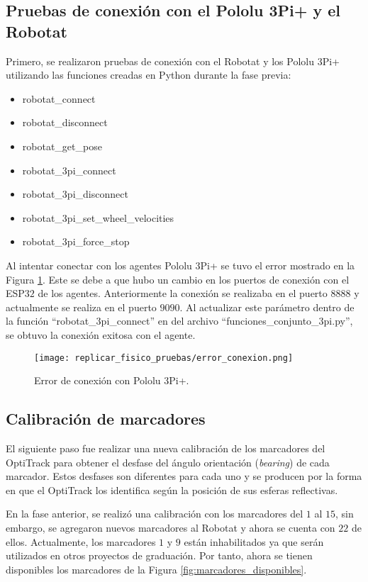 \subsection{Pruebas de conexión con el Pololu 3Pi+ y el Robotat}
 Primero, se realizaron pruebas de conexión con el Robotat y los Pololu 3Pi+ utilizando las funciones creadas en Python durante la fase previa:
 
\begin{itemize}
	\item robotat\_connect
	\item robotat\_disconnect
	\item robotat\_get\_pose
	\item robotat\_3pi\_connect
	\item robotat\_3pi\_disconnect
	\item robotat\_3pi\_set\_wheel\_velocities
	\item robotat\_3pi\_force\_stop
\end{itemize}

Al intentar conectar con los agentes Pololu 3Pi+ se tuvo el error mostrado en la Figura \ref{fig:error_conexion}. Este se debe a que hubo un cambio en los puertos de conexión con el ESP$32$ de los agentes. Anteriormente la conexión se realizaba en el puerto $8888$ y actualmente se realiza en el puerto $9090$. Al actualizar este parámetro dentro de la función ``robotat\_3pi\_connect'' en del archivo ``funciones\_conjunto\_3pi.py'', se obtuvo la conexión exitosa con el agente.

\begin{figure}[H]
	\centering
	\texttt{[image: replicar\_fisico\_pruebas/error\_conexion.png]}
	\caption{Error de conexión con Pololu 3Pi+.}
	\label{fig:error_conexion}
\end{figure}

\subsection{Calibración de marcadores}
El siguiente paso fue realizar una nueva calibración de los marcadores del OptiTrack para obtener el desfase del ángulo orientación (\textit{bearing}) de cada marcador. Estos desfases son diferentes para cada uno y se producen por la forma en que el OptiTrack los identifica según la posición de sus esferas reflectivas.

En la fase anterior, se realizó una calibración con los marcadores del $1$ al $15$, sin embargo, se agregaron nuevos marcadores al Robotat y ahora se cuenta con $22$ de ellos. Actualmente, los marcadores $1$ y $9$ están inhabilitados ya que serán utilizados en otros proyectos de graduación. Por tanto, ahora se tienen disponibles los marcadores de la Figura \ref{fig:marcadores_disponibles}. 

